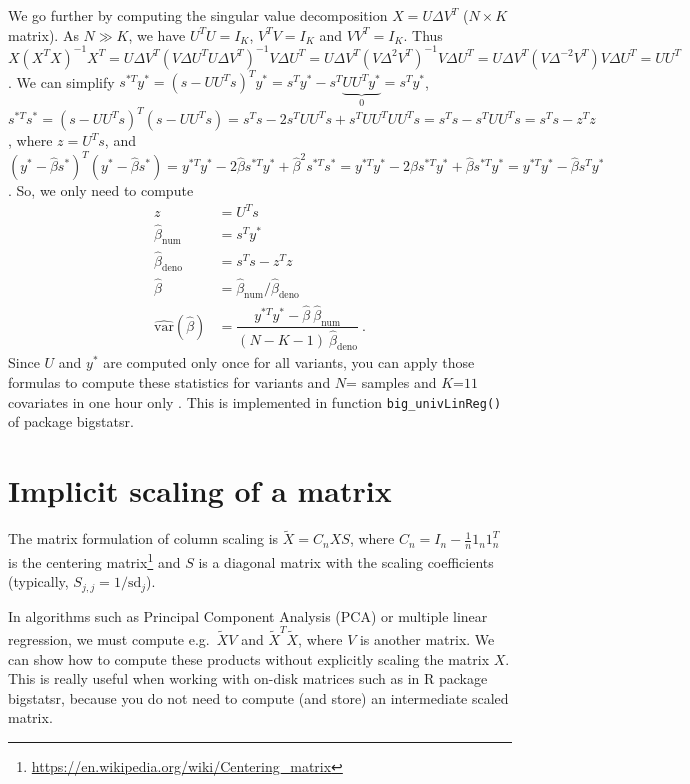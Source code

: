 We go further by computing the singular value decomposition $X = U \Delta V^T$ ($N \times K$ matrix). As $N \gg K$, we have $U^T U = I_K$, $V^T V  = I_K$ and $V V^T = I_K$. Thus $X (X^T X)^{-1} X^T = U \Delta V^T (V \Delta U^T U \Delta V^T)^{-1} V \Delta U^T = U \Delta V^T (V \Delta^2 V^T)^{-1} V \Delta U^T = U \Delta V^T (V \Delta^{-2} V^T) V \Delta U^T = U U^T$.
We can simplify $s^{*T} y^* = (s - U U^T s)^T y^* = s^T y^* - s^T \underbrace{U U^T y^*}_0 = s^T y^*$, 
$s^{*T} s^* = (s - U U^T s)^T (s - U U^T s) = s^T s - 2 s^T U U^T s + s^T U U^T U U^T s = s^T s - s^T U U^T s = s^T s - z^T z$, where $z = U^T s$, 
and $(y^* - \hat{\beta} s^*)^T (y^* - \hat{\beta} s^*) = y^{*T} y^* - 2 \hat{\beta} s^{*T} y^* + \hat{\beta}^2 s^{*T} s^* = y^{*T} y^* - 2 \hat{\beta} s^{*T} y^* + \hat{\beta} s^{*T} y^* = y^{*T} y^* - \hat{\beta} s^{T} y^*$.
So, we only need to compute
\begin{align*}
z &= U^T s \\
\hat{\beta}_{\text{num}} &= s^{T} y^* \\
\hat{\beta}_{\text{deno}} &= s^T s - z^T z \\
\hat{\beta} &= \hat{\beta}_{\text{num}} / \hat{\beta}_{\text{deno}} \\
\widehat{\text{var}}(\hat{\beta}) &= \dfrac{y^{*T} y^* - \hat{\beta} ~ \hat{\beta}_{\text{num}}}{(N - K - 1) ~ \hat{\beta}_{\text{deno}}}~.
\end{align*}
Since $U$ and $y^*$ are computed only once for all variants, you can apply those formulas to compute these statistics for  variants and $N$= samples and $K$=$11$ covariates in one hour only \cite[]{prive2018efficient}. This is implemented in function \texttt{big\_univLinReg()} of package bigstatsr.


\section{Implicit scaling of a matrix}

The matrix formulation of column scaling is $\tilde{X} = C_n X S$, where $C_n = I_n - \frac{1}{n} 1_n 1_n^T$ is the centering matrix\footnote{\url{https://en.wikipedia.org/wiki/Centering_matrix}} and $S$ is a diagonal matrix with the scaling coefficients (typically, $S_{j,j} = 1 / \text{sd}_j$). 

In algorithms such as Principal Component Analysis (PCA) or multiple linear regression, we must compute e.g.\ $\tilde{X} V$ and $\tilde{X}^T \tilde{X}$, where $V$ is another matrix. We can show how to compute these products without explicitly scaling the matrix $X$. This is really useful when working with on-disk matrices such as in R package bigstatsr, because you do not need to compute (and store) an intermediate scaled matrix.

